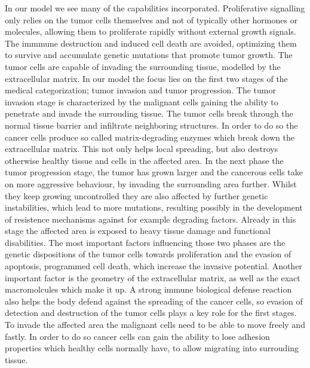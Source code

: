 In our model we see many of the capabilities incorporated. Proliferative signalling only relies on the tumor cells themselves and not of typically other hormones or molecules, allowing them to proliferate rapidly without external growth signals. The immmune destruction and induced cell death are avoided, optimizing them to survive and accumulate genetic mutations that promote tumor growth. The tumor cells are capable of invading the surrounding tissue, modelled by the extracellular matrix.
\newline 
In our model the focus lies on the first two stages of the medical categorization; tumor invasion and tumor progression. The tumor invasion stage is characterized by the malignant cells gaining the ability to penetrate and invade the surrouding tissue. The tumor cells break through the normal tissue barrier and infiltrate neighboring structures. In order to do so the cancer cells produce so called matrix-degrading enzymes which break down the extracellular matrix. This not only helps local spreading, but also destroys otherwise healthy tissue and cells in the affected area. In the next phase the tumor progression stage, the tumor has grown larger and the cancerous cells take on more aggressive behaviour, by invading the surrounding area further. Whilst they keep growing uncontrolled they are also affected by further genetic instabilities, which lead to more mutations, resulting possibly in the development of resistence mechanisms against for example degrading factors. Already in this stage the affected area is exposed to heavy tissue damage and functional disabilities.\newline
The most important factors influencing those two phases are the genetic dispositions of the tumor cells towards proliferation and the evasion of apoptosis, programmed cell death, which increase the invasive potential. Another important factor is the geometry of the extracellular matrix, as well as the exact macromolcules which make it up. A strong immune biological defense reaction also helps the body defend against the spreading of the cancer cells, so evasion of detection and destruction of the tumor cells plays a key role for the first stages. To invade the affected area the malignant cells need to be able to move freely and fastly. In order to do so cancer cells can gain the ability to lose adhesion properties which healthy cells normally have, to allow migrating into surrouding tissue. 


